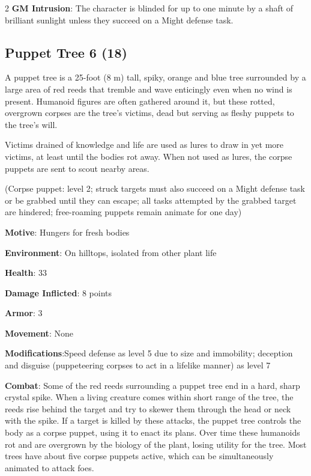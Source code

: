 \begin{multicols}{2}
\textbf{GM Intrusion}: The character is blinded for up to one minute by a shaft of brilliant sunlight unless they succeed on a Might defense task. 

\subsection{Puppet Tree	6 (18)}

A puppet tree is a 25-foot (8 m) tall, spiky, orange and blue tree surrounded by a large area of red reeds that tremble and wave enticingly even when no wind is present. Humanoid figures are often gathered around it, but these rotted, overgrown corpses are the tree’s victims, dead but serving as fleshy puppets to the tree’s will.

Victims drained of knowledge and life are used as lures to draw in yet more victims, at least until the bodies rot away. When not used as lures, the corpse puppets are sent to scout nearby areas.

(Corpse puppet: level 2; struck targets must also succeed on a Might defense task or be grabbed until they can escape; all tasks attempted by the grabbed target are hindered; free-roaming puppets remain animate for one day)

\textbf{Motive}: Hungers for fresh bodies

\textbf{Environment}: On hilltops, isolated from other plant life

\textbf{Health}: 33

\textbf{Damage Inflicted}: 8 points

\textbf{Armor}: 3

\textbf{Movement}: None

\textbf{Modifications}:Speed defense as level 5 due to size and immobility; deception and disguise (puppeteering corpses to act in a lifelike manner) as level 7

\textbf{Combat}: Some of the red reeds surrounding a puppet tree end in a hard,
sharp crystal spike. When a living creature comes within short
range of the tree, the reeds rise behind the target and try to skewer them through the head or neck with the spike. If a target is killed by these attacks, the puppet tree controls the body as a corpse puppet, using it to enact its plans. Over time these humanoids rot and are overgrown by the biology of the plant, losing utility for the tree. Most trees have about five corpse puppets active, which can be simultaneously animated to attack foes.


\end{multicols}
